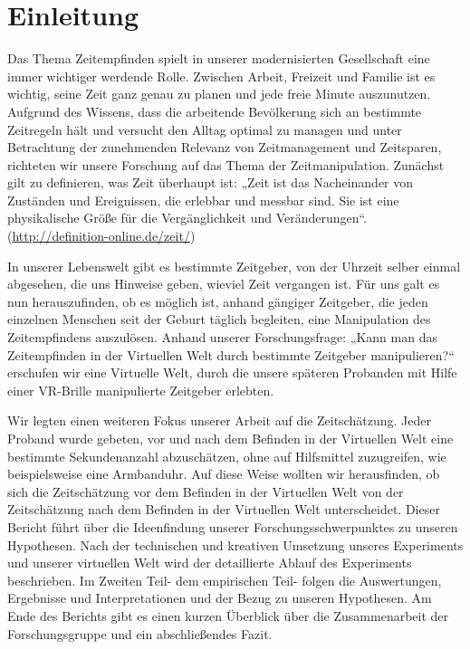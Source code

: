 \documentclass{Bericht}
\begin{document}
\maketitle


\tableofcontents
\clearpage

\section{Einleitung} %
	Das Thema Zeitempfinden spielt in unserer modernisierten Gesellschaft eine immer wichtiger werdende Rolle. Zwischen Arbeit, Freizeit und Familie ist es wichtig, seine Zeit ganz genau zu planen und jede freie Minute auszunutzen. Aufgrund des Wissens, dass die arbeitende Bevölkerung sich an bestimmte Zeitregeln hält und versucht den Alltag optimal zu managen und unter Betrachtung der zunehmenden Relevanz von Zeitmanagement und Zeitsparen, richteten wir unsere Forschung auf das Thema der Zeitmanipulation. Zunächst gilt zu definieren, was Zeit überhaupt ist: „Zeit ist das Nacheinander von Zuständen und Ereignissen, die erlebbar und messbar sind. Sie ist eine physikalische Größe für die Vergänglichkeit und Veränderungen“. (\underline{http://definition-online.de/zeit/})

	In unserer Lebenswelt gibt es bestimmte Zeitgeber, von der Uhrzeit selber einmal abgesehen, die uns Hinweise geben, wieviel Zeit vergangen ist. Für uns galt es nun herauszufinden, ob es möglich ist, anhand gängiger Zeitgeber, die jeden einzelnen Menschen seit der Geburt täglich begleiten, eine Manipulation des Zeitempfindens auszulösen. Anhand unserer Forschungsfrage: „Kann man das Zeitempfinden in der Virtuellen Welt durch bestimmte Zeitgeber manipulieren?“ erschufen wir eine Virtuelle Welt, durch die unsere späteren Probanden mit Hilfe einer VR-Brille manipulierte Zeitgeber erlebten. 

	 Wir legten einen weiteren Fokus unserer Arbeit auf die Zeitschätzung. Jeder Proband wurde gebeten, vor und nach dem Befinden in der Virtuellen Welt eine bestimmte Sekundenanzahl abzuschätzen, ohne auf Hilfsmittel zuzugreifen, wie beispielsweise eine Armbanduhr. Auf diese Weise wollten wir herausfinden, ob sich die Zeitschätzung vor dem Befinden in der Virtuellen Welt von der Zeitschätzung nach dem Befinden in der Virtuellen Welt unterscheidet.
Dieser Bericht führt über die Ideenfindung unserer Forschungsschwerpunktes zu unseren Hypothesen. Nach der technischen und kreativen Umsetzung unseres Experiments und unserer virtuellen Welt wird der detaillierte Ablauf des Experiments beschrieben. Im Zweiten Teil- dem empirischen Teil- folgen die Auswertungen, Ergebnisse und Interpretationen und der Bezug zu unseren Hypothesen. Am Ende des Berichts gibt es einen kurzen Überblick über die Zusammenarbeit der Forschungsgruppe und ein abschließendes Fazit. 
\end{document}
